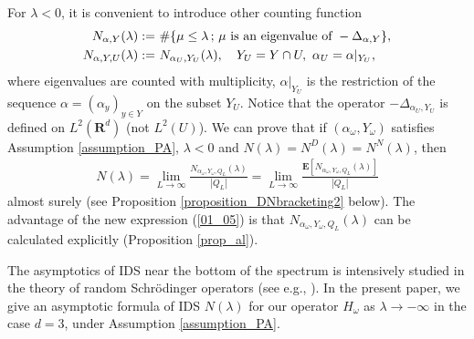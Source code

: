 \documentclass[12pt,a4paper]{article}
\begin{document}
For $\lambda<0$,
it is convenient to introduce other counting function
\begin{align*}
 N_{\alpha,Y}(\lambda):=&\ 
\#\{\mu \leq \lambda \,;\,
\mu \mbox{ is an eigenvalue of }- \Delta_{\alpha,Y} \},
\notag
\\
 N_{\alpha,Y,U}(\lambda):=&\ 
 N_{\alpha_U,Y_U}(\lambda),\quad
Y_U=Y\cap U,\ \alpha_U=\alpha|_{Y_U},
\end{align*}
where eigenvalues are counted with multiplicity,
$\alpha|_{Y_U}$ is the restriction of
the sequence $\alpha=(\alpha_y)_{y\in Y}$ on the subset 
$Y_U$.
Notice that the operator $-\Delta_{\alpha_U,Y_U}$
is defined on $L^2(\mathbf{R}^d)$ (not $L^2(U)$).
We can prove that
if 
$(\alpha_\omega,Y_\omega)$ satisfies Assumption \ref{assumption_PA},
$\lambda<0$ and
$N(\lambda) = N^D(\lambda)=N^N(\lambda)$, then
\begin{align}
\label{01_05}
N(\lambda)
=
\lim_{L\to \infty}
\frac{ N_{\alpha_\omega,Y_\omega,Q_L}(\lambda)}{|Q_L|}
=
\lim_{L\to \infty}
\frac{\mathbf{E}[N_{\alpha_\omega,Y_\omega,Q_L}(\lambda)]}{|Q_L|}
\end{align}
almost surely
(see Proposition \ref{proposition_DNbracketing2} below).
The advantage of the new expression (\ref{01_05}) is that
$N_{\alpha_\omega,Y_\omega,Q_L}(\lambda)$ can be calculated explicitly
(Proposition \ref{prop_al}).


The asymptotics of IDS near the bottom of the spectrum
is intensively studied in the theory of random Schr\"odinger operators
(see e.g., \cite{Ca-La, Pa-Fi,Ki-Me, Ve}).
In the present paper,
we give an asymptotic formula of IDS $N(\lambda) $ for our operator 
$H_\omega$ as $\lambda \to -\infty$ in the case $d=3$,
under Assumption \ref{assumption_PA}.
\end{document}

